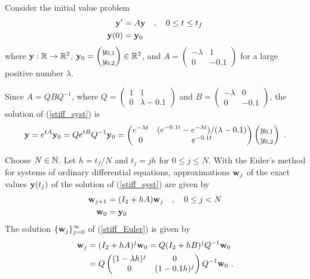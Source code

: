 \begin{egg}
Consider the initial value problem
\begin{equation}\label{stiff_syst}
\begin{split}
\mathbf{y}' &= A \mathbf{y} \quad , \quad 0 \leq t \leq t_f \\
\mathbf{y}(0) &= \mathbf{y}_0
\end{split}
\end{equation}
where $\mathbf{y}:\mathbb{R}\rightarrow \mathbb{R}^2$,
$\mathbf{y}_0 =  \begin{pmatrix}
y_{0,1} \\ y_{0,2}
\end{pmatrix} \in \mathbb{R}^2$, and
$A = \begin{pmatrix}
-\lambda & 1 \\
0 & -0.1
\end{pmatrix}$ for a large positive number $\lambda$.

Since $A = Q B Q^{-1}$, where
$Q=\begin{pmatrix}
1 & 1 \\
0 & \lambda -0.1
\end{pmatrix}$ and
$B=\begin{pmatrix}
-\lambda & 0 \\
0 & -0.1
\end{pmatrix}$, the solution of (\ref{stiff_syst}) is
\begin{equation}\label{sol_stiff_syst}
\mathbf{y} = e^{tA}\mathbf{y}_0 = Q e^{tB} Q^{-1} \mathbf{y}_0
= \begin{pmatrix}
e^{-\lambda t} &
\displaystyle (e^{-0.1 t}-e^{-\lambda t})/(\lambda-0.1) \\
0 & e^{-0.1 t}
\end{pmatrix}
\begin{pmatrix}
y_{0,1} \\ y_{0,2}
\end{pmatrix} \ .
\end{equation}

Choose $N \in \mathbb{N}$.  Let $h=t_f/N$ and $t_j = jh$ for $0 \leq j \leq N$.
With the Euler's method for systems of ordinary
differential equations, approximations $\mathbf{w}_j$ of the exact
values $\mathbf{y}(t_j)$ of the solution of (\ref{stiff_syst}) are given
by
\begin{equation}
\label{stiff_Euler}
\begin{split}
\mathbf{w}_{j+1} &= (I_2 + hA)\mathbf{w}_j \quad , \quad 0 \leq j < N \\
\mathbf{w}_0 &= \mathbf{y}_0
\end{split}
\end{equation}
The solution
$\displaystyle \{\mathbf{w}_j\}_{j=0}^\infty$ of (\ref{stiff_Euler}) is
given by
\begin{equation} \label{sol_stiff_Euler}
\begin{split}
\mathbf{w}_j &= (I_2+hA)^j \mathbf{w}_0 = Q(I_2+hB)^j Q^{-1}\mathbf{w}_0 \\
&= Q \begin{pmatrix}
(1-\lambda h)^j & 0 \\
0 & (1-0.1 h)^j
\end{pmatrix}
Q^{-1} \mathbf{w}_0 \ .
\end{split}
\end{equation}


\end{egg}
